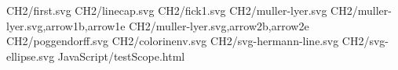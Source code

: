 CH2/first.svg
CH2/linecap.svg
CH2/fick1.svg
CH2/muller-lyer.svg
CH2/muller-lyer.svg,arrow1b,arrow1e
CH2/muller-lyer.svg,arrow2b,arrow2e
CH2/poggendorff.svg
CH2/colorinenv.svg
CH2/svg-hermann-line.svg
CH2/svg-ellipse.svg
JavaScript/testScope.html
